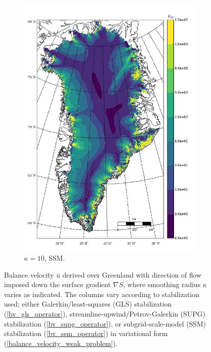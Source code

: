 \begin{figure}
\begin{subfigure}[b]{0.25\linewidth}
    \includegraphics[width=\linewidth]{images/balance_velocity/greenland/Ubar_5H_kappa_10_SSM.jpg}
  \caption{$\kappa = 10$, SSM.}
  \label{greenland_bv_image_kappa_10_SSM}
  \end{subfigure}
 
  \caption[Greenland balance-velocity with $\mathbf{d}^{\text{data}} = -\nabla S$.]{Balance velocity $\bar{u}$ derived over Greenland with direction of flow imposed down the surface gradient $\nabla S$, where smoothing radius $\kappa$ varies as indicated.  The columns vary according to stabilization used; either Galerkin/least-squares (GLS) stabilization (\ref{bv_gls_operator}), streamline-upwind/Petrov-Galerkin (SUPG) stabilization (\ref{bv_supg_operator}), or subgrid-scale-model (SSM) stabilization (\ref{bv_ssm_operator}) in variational form (\ref{balance_velocity_weak_problem}). \newline}

  \label{greenland_bv_image}

\end{figure}

